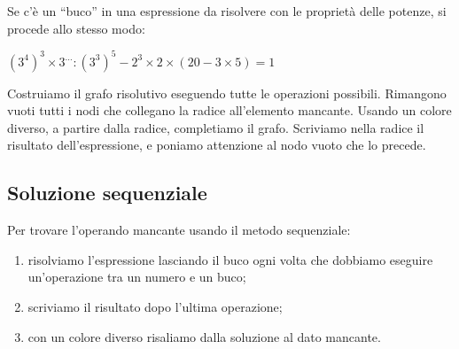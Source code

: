 \begin{esempio}{}{}
Se c'è un ``buco'' in una espressione da risolvere con le proprietà delle 
potenze, si procede allo stesso modo:

\((3^4)^3 \times 3^{\dots} : (3^3)^5 -2^3 \times 2 \times 
(20 -3 \times 5) = 1\)

Costruiamo il grafo risolutivo eseguendo tutte le operazioni possibili. 
Rimangono vuoti tutti i nodi che collegano la radice all'elemento
mancante. 
Usando un colore diverso, a partire dalla radice, completiamo il grafo. 
Scriviamo nella radice il risultato dell'espressione, e poniamo attenzione 
al nodo vuoto che lo precede.

\end{esempio}


\subsection{Soluzione sequenziale}

\begin{procedura}{}{}
 Per trovare l'operando mancante usando il metodo sequenziale:
\begin{enumerate} [noitemsep]
 \item risolviamo l'espressione lasciando il buco ogni volta che 
  dobbiamo eseguire un'operazione tra un numero e un buco;
 \item scriviamo il risultato dopo l'ultima operazione;
 \item con un colore diverso risaliamo dalla soluzione al dato mancante.
\end{enumerate}
\end{procedura}


